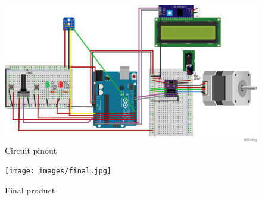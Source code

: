 \documentclass[a4paper,12pt]{article}
\begin{document}
\begin{figure}[H]
    \begin{center}
        \includegraphics[width=14cm]{images/circuit.PNG}
        \caption{Circuit pinout}
        \label{fig:pinout}
    \end{center}
\end{figure}

\begin{figure}[H]
    \begin{center}
        \texttt{[image: images/final.jpg]}
        \caption{Final product}
        \label{fig:final}
    \end{center}
\end{figure}
\end{document}
